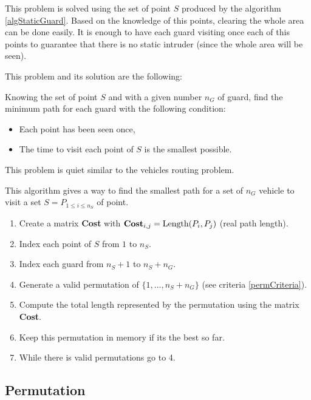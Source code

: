 This problem is solved using the set of point $S$ produced by the algorithm \ref{algStaticGuard}. Based on the knowledge of this points, clearing the whole area can be done easily. It is enough to have each guard visiting once each of this points to guarantee that there is no static intruder (since the whole area will be seen). 

This problem and its solution are the following:

\begin{subproblem}
 Knowing the set of point $S$ and with a given number $n_{G}$ of guard, find the minimum path for each guard with the following condition:
 \begin{itemize}
  \item Each point has been seen once,
  \item The time to visit each point of $S$ is the smallest possible.
 \end{itemize}
This problem is quiet similar to the vehicles routing problem.
\label{subProb3}
\end{subproblem}

\begin{algorithm}
This algorithm gives a way to find the smallest path for a set of $n_{G}$ vehicle to visit a set $S = P_{1\leq i \leq n_S}$ of point.
\begin{enumerate}
  \item Create a matrix \textbf{Cost} with $\text{\textbf{Cost}}_{i,j} = \text{Length}(P_i,P_j)$ (real path length).
  \item Index each point of $S$ from $1$ to $n_{S}$.
  \item Index each guard from $n_{S}+1$ to $ n_{S}+n_{G}$. 
  \item Generate a valid permutation of $\{1,\hdots,n_{S}+n_{G}\}$ (see criteria \ref{permCriteria}).
  \item Compute the total length represented by the permutation using the matrix \textbf{Cost}.
  \item Keep this permutation in memory if its the best so far.
  \item While there is valid permutations go to 4.
\end{enumerate}
\label{dynamicGuard}
\end{algorithm}

\subsection{Permutation}

